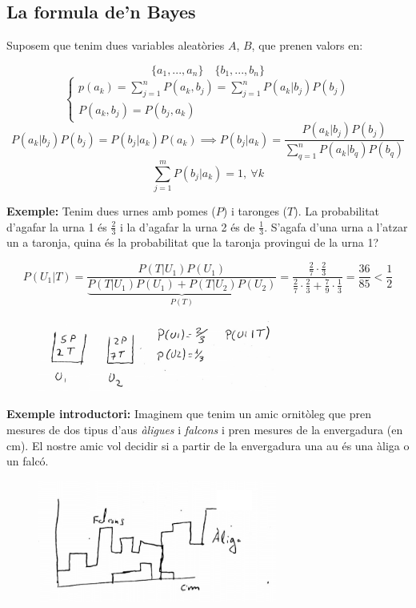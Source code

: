 \documentclass[a4paper]{article}
\begin{document}
\subsection{La formula de'n Bayes}

Suposem que tenim dues variables aleatòries $A$, $B$, que prenen valors en:

$$
\{ a_1, ..., a_n \}\quad \{ b_1, ..., b_n \}
$$
$$
\begin{cases}
p(a_k) = \sum_{j=1}^n P(a_k, b_j) = \sum_{j=1}^n P(a_k | b_j) P(b_j) \\
P(a_k, b_j) = P(b_j, a_k)
\end{cases}
$$
$$
P(a_k | b_j) P(b_j) = P(b_j | a_k) P(a_k) \implies
\boxed{P(b_j | a_k) = \frac{P(a_k | b_j) P(b_j)}{\sum_{q=1}^n P(a_k | b_q) P(b_q)}}
$$
$$
\sum_{j=1}^m P(b_j | a_k) = 1,\ \forall k 
$$

\textbf{Exemple:} Tenim dues urnes amb pomes ($P$) i taronges ($T$). La probabilitat d'agafar la urna 1 és $\frac{2}{3}$ i la d'agafar la urna 2 és de $\frac{1}{3}$. S'agafa d'una urna a l'atzar un a taronja, quina és la probabilitat que la taronja provingui de la urna 1?

$$
P(U_1|T) =  \frac{P(T|U_1) P(U_1)}{\underbrace{P(T|U_1)P(U_1) + P(T|U_2)P(U_2)}_{P(T)}} =
\frac{\frac{2}{7} · \frac{2}{3}}{\frac{2}{7}·\frac{2}{3} + \frac{7}{9}·\frac{1}{3}} =
\frac{36}{85} < \frac{1}{2}
$$

\begin{figure}[H]
	\centering
	\includegraphics[width=0.7\textwidth]{images/tema_5-3}
\end{figure}

\textbf{Exemple introductori:} Imaginem que tenim un amic ornitòleg que pren mesures de dos tipus d'aus \emph{àligues} i \emph{falcons} i pren mesures de la envergadura (en cm). El nostre amic vol decidir si a partir de la envergadura una au és una àliga o un falcó. 

\begin{figure}[H]
	\centering
	\includegraphics[width=0.7\textwidth]{images/tema_5-4}
\end{figure}
\end{document}
